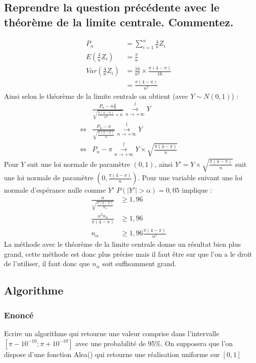 \documentclass[10pt,a4paper,twoside]{article}
\begin{document}
\subsection{Reprendre la question précédente avec le théorème de la limite centrale. Commentez.}
\begin{align*}
P_{n} &= \sum_{i=1}^{n}\frac{4}{n} Z_{i}\\
E\left(\frac{4}{n}Z_{i}\right) &= \frac{\pi}{n}\\
Var\left(\frac{4}{n}Z_{i}\right) &= \frac{16}{n^2}\times\frac{\pi(4-\pi)}{16}\\
&= \frac{\pi(4-\pi)}{n^{2}}
\end{align*}
Ainsi selon le théorème de la limite centrale on obtient (avec $Y\sim N(0,1)$) :
\begin{align*}
 & \frac{P_{n}-n\frac{\pi}{n}}{\sqrt{\frac{\pi(4-\pi)}{n^{2}}\times n}} \overset{l}{\underset{n\rightarrow+\infty}{\longrightarrow}} Y\\
 \Leftrightarrow & \frac{P_{n}-\pi}{\sqrt{\frac{\pi(4-\pi)}{n}}} \overset{l}{\underset{n\rightarrow+\infty}{\longrightarrow}} Y\\
 \Leftrightarrow & P_{n}-\pi  \overset{l}{\underset{n\rightarrow+\infty}{\longrightarrow}} Y\times\sqrt{\frac{\pi(4-\pi)}{n}}
\end{align*}
Pour $Y$ suit une loi normale de paramètre $(0,1)$, ainsi $Y'= Y\times\sqrt{\frac{\pi(4-\pi)}{n}}$ suit une loi normale de paramètre $\left(0,\frac{\pi(4-\pi)}{n}\right)$. Pour une variable suivant une loi normale d'espérance nulle comme $Y'$ $P(|Y'|>\alpha)=0,05$ implique :
\begin{align*}
\frac{\alpha}{\sqrt{\frac{\pi(4-\pi)}{n_{\alpha}}}} &\geqslant 1,96\\
\frac{\alpha^{2}n_{\alpha}}{\pi(4-\pi)} &\geqslant 1,96\\
n_{\alpha} &\geqslant 1,96\frac{\pi(4-\pi)}{\alpha^{2}}
\end{align*}
La méthode avec le théorème de la limite centrale donne un résultat bien plus grand, cette méthode est donc plus précise mais il faut être sur que l'on a le droit de l'utiliser, il faut donc que $n_{\alpha}$ soit suffisamment grand.

\subsection{Algorithme}
\subsubsection*{Enoncé}
Ecrire un algorithme qui retourne une valeur comprise dans l'intervalle $[\pi-10^{-10};\pi+10^{-10}]$ avec une probabilité de 95\%. On supposera que l'on dispose d'une fonction Alea() qui retourne une réalisation uniforme sur $[0,1]$
\end{document}
